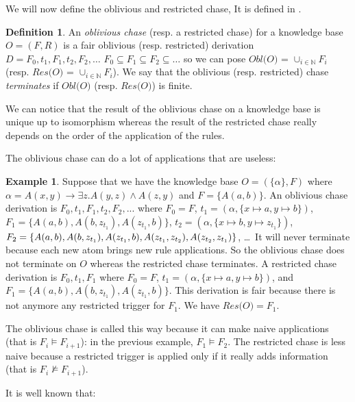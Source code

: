 \documentclass{article}
\theoremstyle{definition}
\newtheorem{definition}{Definition}[section]
\newtheorem{example}{Example}[section]
\theoremstyle{remark}
\def \N {\mathbb N}
\begin{document}
We will now define the oblivious and restricted chase, It is defined in \cite{obl_res}.


\begin{definition}
An \emph{oblivious chase} (resp. a restricted chase) for a knowledge base $O= (F,R)$ is a fair oblivious (resp. restricted) derivation $D=F_0,t_1,F_1,t_2,F_2,\ldots$ $F_0 \subseteq F_1 \subseteq F_2 \subseteq \ldots$ so we can pose \emph{$\textit{Obl(O)}$} = $\cup_{i \in \N}F_i$ (resp. \emph{$\textit{Res(O)}$} = $\cup_{i \in \N}F_i$).
We say that the oblivious (resp. restricted) chase \emph{terminates} if $\textit{Obl(O)}$ (resp. $\textit{Res(O)}$) is finite.
\end{definition}

We can notice that the result of the oblivious chase on a knowledge base is unique up to isomorphism whereas the result of the restricted chase really depends on the order of the application of the rules.

The oblivious chase  can do a lot of applications that are useless: 
\begin{example}
Suppose that we have the knowledge base $O=(\{\alpha\},F)$ where $\alpha = A(x,y) \rightarrow \exists z.A(y,z) \wedge A(z,y)$ and $F =  \{A(a,b)\}$. An oblivious chase derivation is $F_0,t_1,F_1,t_2,F_2,...$ where $F_0 = F$, $t_1=(\alpha,\{x \mapsto a, y \mapsto b\})$, $F_1=\{A(a,b),A(b,z_{t_1}),A(z_{t_1},b)\}$, $t_2=(\alpha,\{x \mapsto b, y \mapsto z_{t_1}\})$, $F_2=\{A(a,b),A(b,z_{t_1}), \\ A(z_{t_1},b), A(z_{t_1},z_{t_2}), A(z_{t_2},z_{t_1})\}$, \ldots\ It will never terminate because each new atom brings new rule applications. So the oblivious chase does not terminate on $O$ whereas the restricted chase terminates. A restricted chase derivation is $F_0,t_1,F_1$ where $F_0 = F$, $t_1=(\alpha,\{x \mapsto a, y \mapsto b\})$, and $F_1=\{A(a,b),A(b,z_{t_1}),A(z_{t_1},b)\}$. This derivation is fair because there is not anymore any restricted trigger for $F_1$. We have $\textit{Res(O)} = F_1$.
\end{example}



The oblivious chase is called this way because it can make naive applications (that is $F_i \vDash F_{i+1}$): in the previous example, $F_1 \models F_2$. The restricted chase is less naive because a restricted trigger is applied only if it really adds information (that is $F_i \nvDash F_{i+1}$).

It is well known that:
\end{document}
